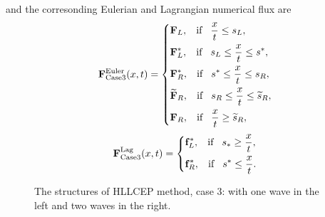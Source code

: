 \documentclass[review]{elsarticle}
\begin{document}
  and the corresonding Eulerian and Lagrangian numerical flux are
 \begin{equation}\label{eq:HLLCEP3}
   \mathbf{F}^{\text{Euler}}_{\text{Case3}}(x,t) = \left\{ \begin{aligned}
        & \mathbf{F}_L, \hspace{0.3cm} \text{if} \hspace{0.3cm} \frac{x}{t}\le s_L, \\
        & \mathbf{F}_L^*, \hspace{0.3cm} \text{if} \hspace{0.3cm} s_L\le \frac{x}{t} \le s^*, \\
        & \mathbf{F}_R^*, \hspace{0.3cm} \text{if} \hspace{0.3cm} s^*\le \frac{x}{t} \le s_R, \\
        &  \widetilde{\mathbf{F}}_R, \hspace{0.3cm} \text{if} \hspace{0.3cm} s_R\le \frac{x}{t} \le \widetilde{s}_R,\\
        & \mathbf{F}_R, \hspace{0.3cm} \text{if} \hspace{0.3cm} \frac{x}{t}\ge \widetilde{s}_R, \\
      \end{aligned}
    \right.
  \end{equation}
\begin{equation}
    \mathbf{F}^{\text{Lag}}_{\text{Case3}}(x,t) = \left\{ \begin{aligned}
        & \mathbf{f}_L^*, \hspace{0.3cm} \text{if} \hspace{0.3cm} s_*\ge \frac{x}{t},\\
        & \mathbf{f}_R^*, \hspace{0.3cm} \text{if} \hspace{0.3cm} s^*\le \frac{x}{t}.\\
      \end{aligned}
    \right.
  \end{equation}
%
\begin{figure}[ht]
  \centering
\caption{The  structures of HLLCEP method, case 3: with one wave in the left and two waves in  the right.}
\label{fig:case3}
\end{figure}
\end{document}
